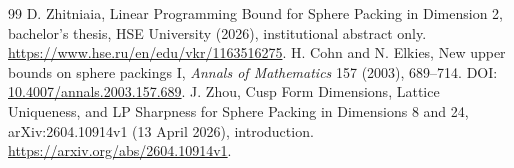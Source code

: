 \documentclass[11pt]{article}
\begin{document}
\begin{thebibliography}{99}
 D. Zhitniaia, Linear Programming Bound for Sphere Packing in Dimension 2, bachelor's thesis, HSE University (2026), institutional abstract only. \url{https://www.hse.ru/en/edu/vkr/1163516275}.
 H. Cohn and N. Elkies, New upper bounds on sphere packings I, \emph{Annals of Mathematics} 157 (2003), 689--714. DOI: \href{https://doi.org/10.4007/annals.2003.157.689}{10.4007/annals.2003.157.689}.
 J. Zhou, Cusp Form Dimensions, Lattice Uniqueness, and LP Sharpness for Sphere Packing in Dimensions 8 and 24, arXiv:2604.10914v1 (13 April 2026), introduction. \url{https://arxiv.org/abs/2604.10914v1}.
\end{thebibliography}
\end{document}
